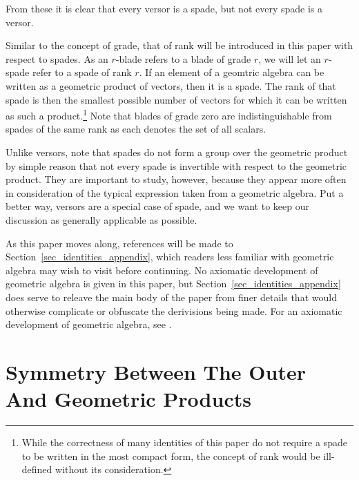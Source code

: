 \documentclass{birkjour}
\theoremstyle{definition}
\theoremstyle{remark}
\numberwithin{equation}{section}
\begin{document}
From these it is clear that every versor is a spade, but not every spade is a versor.

Similar to the concept of grade, that of rank will be introduced in this paper with respect to spades.  As an $r$-blade
refers to a blade of grade $r$, we will let an $r$-spade refer to a spade of rank $r$.  If an element of a geomtric
algebra can be written as a geometric product of vectors, then it is a spade.  The rank of that spade is then the smallest
possible number of vectors for which it can be written as such a product.\footnote{While the correctness of many identities of this paper
do not require a spade to be written in the most compact form, the concept of rank would be ill-defined without its consideration.}   Note that blades of grade zero
are indistinguishable from spades of the same rank as each denotes the set of all scalars.

Unlike versors, note that spades do not form a group over the geometric product by simple reason that not every
spade is invertible with respect to the geometric product.  They are important to study, however,
because they appear more often in consideration of the typical expression taken from a geometric algebra.
Put a better way, versors are a special case of spade, and we want to keep our discussion as generally applicable as possible.

As this paper moves along, references will be made to Section~\ref{sec_identities_appendix}, which readers less familiar with geometric
algebra may wish to visit before continuing.
No axiomatic development of geometric algebra is given in this paper, but Section~\ref{sec_identities_appendix} does serve to releave the main
body of the paper from finer details that would otherwise complicate or obfuscate the derivisions being made.  For an axiomatic
development of geometric algebra, see \cite{}.

\section{Symmetry Between The Outer And Geometric Products}
\end{document}
